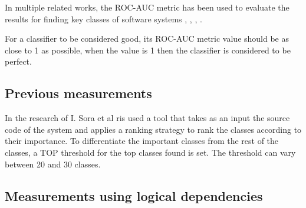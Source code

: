 \documentclass[12pt]{mitthesis}
\begin{document}
In multiple related works, the ROC-AUC metric has been used to evaluate the results for finding key classes of software systems \cite{6676885}, \cite{Finding-key-classes}, \cite{rocclasification}, \cite{7551990}.

For a classifier to be considered good, its ROC-AUC metric value should be as close to 1 as possible, when the value is 1 then the classifier is considered to be perfect.

\subsection{Previous measurements}

In the research of I. Sora et al \cite{Finding-key-classes} ris used a tool that takes as an input the source code of the system and applies a ranking strategy to rank the classes according to their importance. To differentiate the important classes from the rest of the classes, a TOP threshold for the top classes found is set. The threshold can vary between 20 and 30 classes.


\subsection{Measurements using logical dependencies}

\begin{table}[!h]
\renewcommand{\arraystretch}{1}
\caption{Measurements for Ant using structural and logical dependencies combined}
\label{tab:measurementscombined:ant}
\centering
{}
\end{table}
\end{document}
